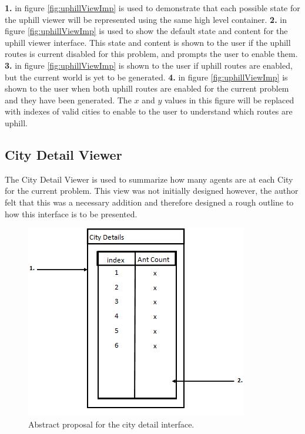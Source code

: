 \textbf{1.} in figure \ref{fig:uphillViewImp} is used to demonstrate that each possible state for the uphill viewer will be represented using the same high level container. \textbf{2.} in figure \ref{fig:uphillViewImp} is used to show the default state and content for the uphill viewer interface. This state and content is shown to the user if the uphill routes is current disabled for this problem, and prompts the user to enable them. \textbf{3.} in figure \ref{fig:uphillViewImp} is shown to the user if uphill routes are enabled, but the current world is yet to be generated. \textbf{4.} in figure \ref{fig:uphillViewImp} is shown to the user when both uphill routes are enabled for the current problem and they have been generated. The $x$ and $y$ values in this figure will be replaced with indexes of valid cities to enable to the user to understand which routes are uphill.

\subsection{City Detail Viewer}
\label{deetzlview}

The City Detail Viewer is used to summarize how many agents are at each City for the current problem. This view was not initially designed however, the author felt that this was a necessary addition and therefore designed a rough outline to how this interface is to be presented.

\begin{figure}[H]
\centering
\includegraphics[scale=0.7]{Images/chapter4/citydetails}
\caption{Abstract proposal for the city detail interface.}
\label{fig:deetzViewImp}
\end{figure}

